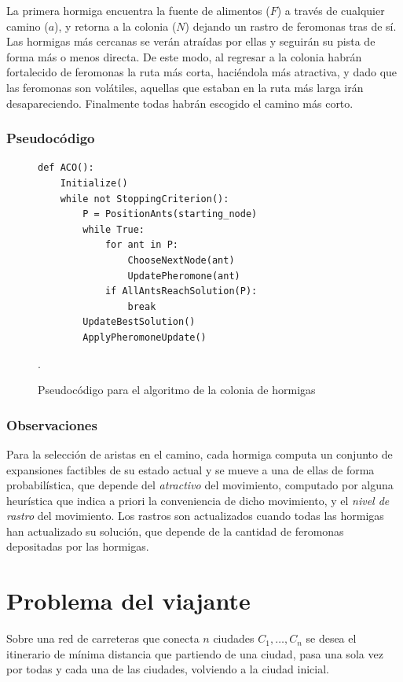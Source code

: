 \documentclass[titlepage, 11pt]{scrartcl}
\begin{document}
			La primera hormiga encuentra la fuente de alimentos ($F$) a través de cualquier camino ($a$), y retorna a la colonia ($N$) dejando un rastro de feromonas tras de sí. Las hormigas más cercanas se verán atraídas por ellas y seguirán su pista de forma más o menos directa. De este modo, al regresar a la colonia habrán fortalecido de feromonas la ruta más corta, haciéndola más atractiva, y dado que las feromonas son volátiles, aquellas que estaban en la ruta más larga irán desapareciendo. Finalmente todas habrán escogido el camino más corto.
			
			\subsubsection{Pseudocódigo}
				\begin{figure}[H]
					\begin{verbatim}
def ACO():
	Initialize()
	while not StoppingCriterion():
		P = PositionAnts(starting_node)
		while True:
			for ant in P:
				ChooseNextNode(ant)
				UpdatePheromone(ant)
			if AllAntsReachSolution(P):
				break
		UpdateBestSolution()
		ApplyPheromoneUpdate()		
	    			\end{verbatim}
	    			\caption{Pseudocódigo para el algoritmo de la colonia de hormigas}.
    			\end{figure}
    		
    		\subsubsection{Observaciones}
    			Para la selección de aristas en el camino, cada hormiga computa un conjunto de expansiones factibles de su estado actual y se mueve a una de ellas de forma probabilística, que depende del \textit{atractivo} del movimiento, computado por alguna heurística que indica a priori la conveniencia de dicho movimiento, y el \textit{nivel de rastro} del movimiento. Los rastros son actualizados cuando todas las hormigas han actualizado su solución, que depende de la cantidad de feromonas depositadas por las hormigas.
		    
 	\section{Problema del viajante}
 	
 		Sobre una red de carreteras que conecta $n$ ciudades $C_1, \ldots, C_n$ se desea el itinerario de mínima distancia que partiendo de una ciudad, pasa una sola vez por todas y cada una de las ciudades, volviendo a la ciudad inicial.
 		
\end{document}
